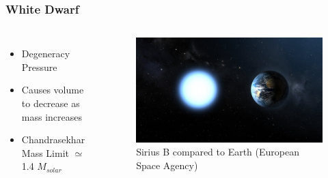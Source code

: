 \documentclass{beamer}
\begin{document}

\begin{frame}
\frametitle{White Dwarf}

\begin{columns}[c]
        \begin{itemize}
                \item Degeneracy Pressure
		\item Causes volume to decrease as mass increases
		\item Chandrasekhar Mass Limit $\simeq$ 1.4 $M_{solar}$
        \end{itemize}


        \begin{figure}
    \begin{center}
      \includegraphics[width=.90\linewidth]{white_dwarf.jpeg}
	    \caption{Sirius B compared to Earth (European Space Agency)}
    \end{center}
  \end{figure}

        \end{columns}

\end{frame}



\end{document}

